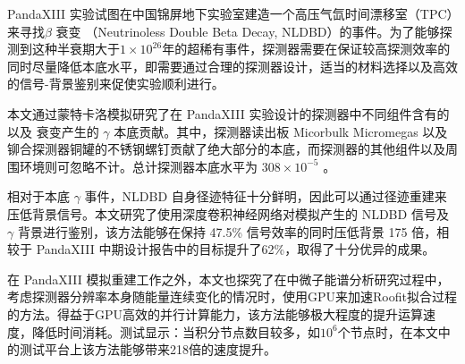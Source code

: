 
\begin{cabstract}
	\pkuthssffaq %
	PandaXIII 实验试图在中国锦屏地下实验室建造一个高压气氙时间漂移室（TPC）来寻找 $\beta$ 衰变 （Neutrinoless Double Beta Decay, NLDBD）的事件。为了能够探测到这种半衰期大于$1\times10^{26}$年的超稀有事件，探测器需要在保证较高探测效率的同时尽量降低本底水平，即需要通过合理的探测器设计，适当的材料选择以及高效的信号-背景鉴别来促使实验顺利进行。

	本文通过蒙特卡洛模拟研究了在 PandaXIII 实验设计的探测器中不同组件含有的 \utte 以及 \thttt 衰变产生的 $\gamma$ 本底贡献。其中，探测器读出板 Micorbulk Micromegas 以及铆合探测器铜罐的不锈钢螺钉贡献了绝大部分的本底，而探测器的其他组件以及周围环境则可忽略不计。总计探测器本底水平为 $308\times 10^{-5}$ \ckky。

	相对于本底 $\gamma$ 事件，NLDBD 自身径迹特征十分鲜明，因此可以通过径迹重建来压低背景信号。本文研究了使用深度卷积神经网络对模拟产生的 NLDBD 信号及 $\gamma$ 背景进行鉴别，该方法能够在保持 47.5\% 信号效率的同时压低背景 175 倍，相较于 PandaXIII 中期设计报告中的目标提升了62\%，取得了十分优异的成果。

	在 PandaXIII 模拟重建工作之外，本文也探究了在中微子能谱分析研究过程中，考虑探测器分辨率本身随能量连续变化的情况时，使用GPU来加速Roofit拟合过程的方法。得益于GPU高效的并行计算能力，该方法能够极大程度的提升运算速度，降低时间消耗。测试显示：当积分节点数目较多，如$10^6$个节点时，在本文中的测试平台上该方法能够带来218倍的速度提升。

\end{cabstract}

